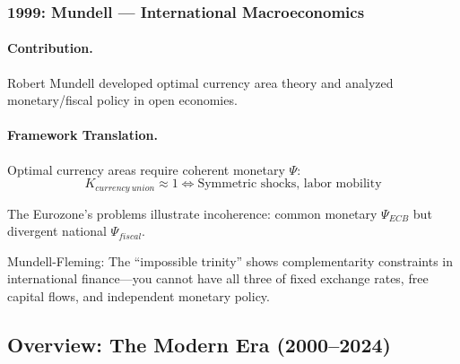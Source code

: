 \documentclass[12pt,a4paper]{article}
\begin{document}
\subsubsection{1999: Mundell --- International Macroeconomics}

\paragraph{Contribution.}
Robert Mundell developed optimal currency area theory and
analyzed monetary/fiscal policy in open economies.

\paragraph{Framework Translation.}
Optimal currency areas require coherent monetary $\Psi$:
\begin{equation}
  K_{currency\ union} \approx 1 \Leftrightarrow \text{Symmetric shocks, labor mobility}
\end{equation}

The Eurozone's problems illustrate incoherence:
common monetary $\Psi_{ECB}$ but divergent national $\Psi_{fiscal}$.

Mundell-Fleming: The ``impossible trinity'' shows complementarity constraints
in international finance---you cannot have all three of fixed exchange rates,
free capital flows, and independent monetary policy.

\subsection{Overview: The Modern Era (2000--2024)}
\end{document}
